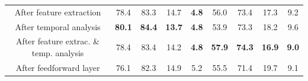 \begin{table}[t]
{\begin{adjustbox}{width=1.2\textwidth,center}
\begin{tabular}{|c|cccc|cccc|}
                After feature extraction                       & 78.4                   & 83.3                   & 14.7                  & \textbf{4.8}           & 56.0                   & 73.4                   & 17.3                  & 9.2                     \\
                After temporal analysis                        & \textbf{80.1}          & \textbf{84.4}          & \textbf{13.7}         & \textbf{4.8}           & 53.9                   & 73.3                   & 18.2                  & 9.6                     \\
                After feature extrac. \& temp. analysis & 78.4                   & 83.4                   & 14.2                  & \textbf{4.8}           & \textbf{57.9}          & \textbf{74.3}          & \textbf{16.9}         & \textbf{9.0}            \\
                After feedforward layer                        & 76.1                   & 82.3                   & 14.9                  & 5.2                    & 55.5                   & 71.4                   & 19.7                  & 9.1                     \\ \hline
            \end{tabular}
            \label{tab:hybrid_nosInjection_oracleInj_oraclePred}
        \end{adjustbox}
    }


\end{table}
